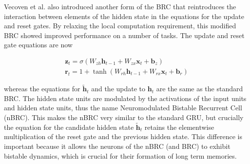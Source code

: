 Vecoven et al. \cite{vecoven2021brc} also introduced another form of the BRC that reintroduces the interaction between elements of the hidden state in the equations for the update and reset gates. By relaxing the local computation requirement, this modified BRC showed improved performance on a number of tasks. The update and reset gate equations are now

\begin{gather*}
	\mathbf{z}_t = \sigma(W_{zh} \mathbf{h}_{t-1} + W_{zx} \mathbf{x}_t + \mathbf{b}_z)\\
	\mathbf{r}_t = 1 + \tanh (W_{rh} \mathbf{h}_{t-1} + W_{rx} \mathbf{x}_t + \mathbf{b}_r)
\end{gather*}

whereas the equations for \(\mathbf{\tilde{h}}_t\) and the update to \(\mathbf{h}_t\) are the same as the standard BRC. The hidden state units are modulated by the activations of the input units and hidden state units, thus the name Neuromodulated Bistable Recurrent Cell (nBRC). This makes the nBRC very similar to the standard GRU, but crucially the equation for the candidate hidden state \(\mathbf{\tilde{h}}_t\) retains the elementwise multiplication of the reset gate and the previous hidden state. This difference is important because it allows the neurons of the nBRC (and BRC) to exhibit bistable dynamics\cite{vecoven2021brc}, which is crucial for their formation of long term memories.